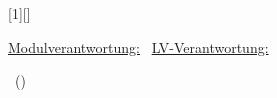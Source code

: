 [1][]{
    \begin{minipage}[l]{0,7\linewidth}
        \vspace{2.5cm}
        {\Large {}\inserttitle} \newline
        {\normalsize {}\mylehrveranstaltung }
    \end{minipage}

    \vspace{1cm}

    \begin{minipage}[t]{0,6\linewidth}
        {\small {} \underline{Modulverantwortung:}\ \mymodulverantwortung}
        {\small {}\underline{LV-Verantwortung:}\ \mylehrveranstaltungsverantwortung} \\ 
    \end{minipage}

    \vspace{0.5cm}

    \begin{minipage}[t]{0,6\linewidth}
        {\small {}\insertauthor\ (\mymatrikel)} \\
        {\small {} \insertdate} \\
        {\small {}\insertshortinstitute} \\
        {\small {}\myuni\ \mycity} \\
    \end{minipage}
}
